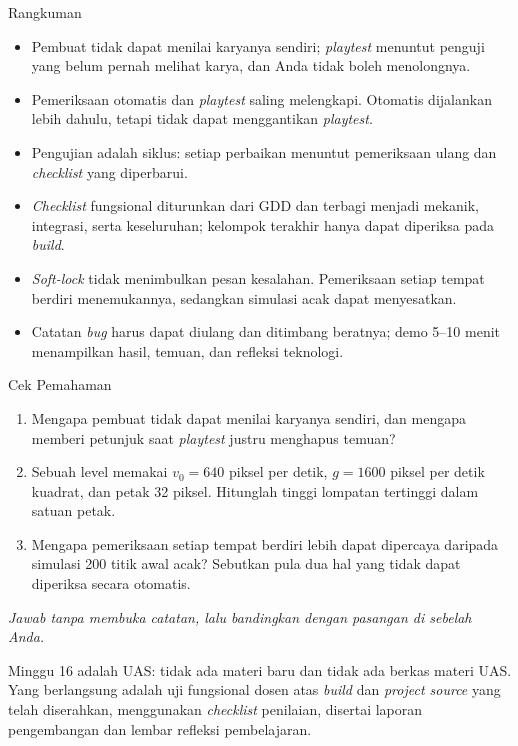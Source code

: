 \documentclass[aspectratio=169,10pt]{beamer}
\begin{document}
\begin{frame}{Rangkuman}
\begin{itemize}
  \item Pembuat tidak dapat menilai karyanya sendiri; \emph{playtest} menuntut
        penguji yang belum pernah melihat karya, dan Anda tidak boleh
        menolongnya.
  \item Pemeriksaan otomatis dan \emph{playtest} saling melengkapi. Otomatis
        dijalankan lebih dahulu, tetapi tidak dapat menggantikan
        \emph{playtest}.
  \item Pengujian adalah siklus: setiap perbaikan menuntut pemeriksaan ulang dan
        \emph{checklist} yang diperbarui.
  \item \emph{Checklist} fungsional diturunkan dari GDD dan terbagi menjadi
        mekanik, integrasi, serta keseluruhan; kelompok terakhir hanya dapat
        diperiksa pada \emph{build}.
  \item \emph{Soft-lock} tidak menimbulkan pesan kesalahan. Pemeriksaan setiap
        tempat berdiri menemukannya, sedangkan simulasi acak dapat menyesatkan.
  \item Catatan \emph{bug} harus dapat diulang dan ditimbang beratnya; demo
        5--10 menit menampilkan hasil, temuan, dan refleksi teknologi.
\end{itemize}
\end{frame}

\begin{frame}{Cek Pemahaman}
\begin{enumerate}
  \item Mengapa pembuat tidak dapat menilai karyanya sendiri, dan mengapa
        memberi petunjuk saat \emph{playtest} justru menghapus temuan?
  \item Sebuah level memakai $v_0=640$ piksel per detik, $g=1600$ piksel per
        detik kuadrat, dan petak 32 piksel. Hitunglah tinggi lompatan tertinggi
        dalam satuan petak.
  \item Mengapa pemeriksaan setiap tempat berdiri lebih dapat dipercaya daripada
        simulasi 200 titik awal acak? Sebutkan pula dua hal yang tidak dapat
        diperiksa secara otomatis.
\end{enumerate}
\vspace{0.35cm}
{\footnotesize\color{ubMuted}\itshape Jawab tanpa membuka catatan, lalu
bandingkan dengan pasangan di sebelah Anda.}
\end{frame}

  {Minggu 16 adalah UAS: tidak ada materi baru dan tidak ada berkas materi UAS.
   Yang berlangsung adalah uji fungsional dosen atas \emph{build} dan
   \emph{project source} yang telah diserahkan, menggunakan \emph{checklist}
   penilaian, disertai laporan pengembangan dan lembar refleksi pembelajaran.}
\end{document}
